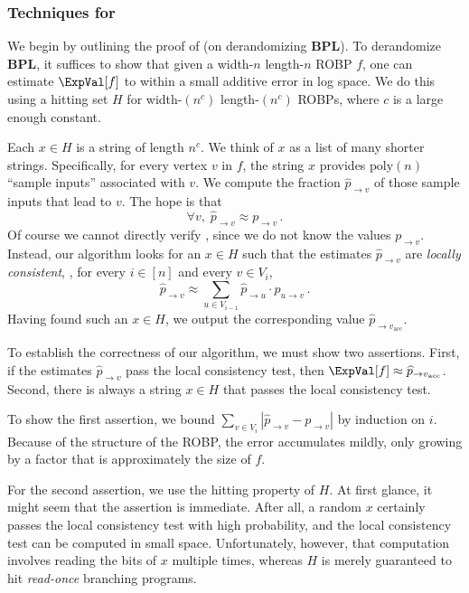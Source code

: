 \subsubsection{Techniques for } \label{sec:poly-width-techniques}

We begin by outlining the proof of  (on derandomizing $\mathbf{BPL}$). To derandomize $\mathbf{BPL}$, it suffices to show that given a width-$n$ length-$n$ ROBP $f$, one can estimate $\ExpVal[f]$ to within a small additive error in log space. We do this using a hitting set $H$ for width-$(n^c)$ length-$(n^c)$ ROBPs, where $c$ is a large enough constant.

Each $x \in H$ is a string of length $n^c$. We think of $x$ as a list of many shorter strings. Specifically, for every vertex $v$ in $f$, the string $x$ provides $\text{poly}(n)$ ``sample inputs'' associated with $v$. We compute the fraction $\widehat{p}_{\to v}$ of those sample inputs that lead to $v$. The hope is that
\begin{equation} \label{eqn:intro-f'} 
\forall v, \; \widehat{p}_{\rightarrow v} \approx p_{\to v}\,.
\end{equation}
Of course we cannot directly verify , since we do not know the values $p_{\to v}$. Instead, our algorithm looks for an $x \in H$ such that the estimates $\widehat{p}_{\to v}$ are  \emph{locally consistent}, \ie, for every $i \in [n]$ and every $v \in V_i$,
$$
\widehat{p}_{\to v} \approx \sum_{u \in V_{i - 1}} \widehat{p}_{\to u} \cdot p_{u \to v}\,.
$$
Having found such an $x \in H$, we output the corresponding value $\widehat{p}_{\to v_{\text{acc}}}$.

To establish the correctness of our algorithm, we must show two assertions. First, if the estimates $\widehat{p}_{\to v}$ pass the local consistency test, then $\ExpVal[f] \approx \widehat{p}_{\to v_{\text{acc}}}$. Second, there is always a string $x\in H$ that passes the local consistency test.

To show the first assertion, we bound $\sum_{v \in V_i} |\widehat{p}_{\to v} - p_{\to v}|$ by induction on $i$. Because of the structure of the ROBP, the error accumulates mildly, only growing by a factor that is approximately the size of $f$.

For the second assertion, we use the hitting property of $H$. At first glance, it might seem that the assertion is immediate. After all, a random $x$ certainly passes the local consistency test with high probability, and the local consistency test can be computed in small space. Unfortunately, however, that computation involves reading the bits of $x$ multiple times, whereas $H$ is merely guaranteed to hit \emph{read-once} branching programs.

